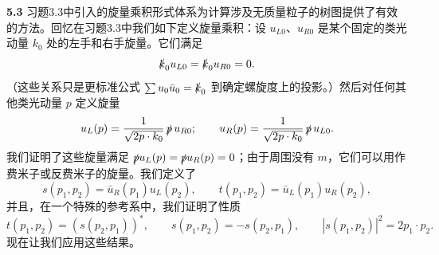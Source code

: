 \textbf{5.3} 习题3.3中引入的旋量乘积形式体系为计算涉及无质量粒子的树图提供了有效的方法。回忆在习题3.3中我们如下定义旋量乘积：设 $u_{L0}$、$u_{R0}$ 是某个固定的类光动量 $k_0$ 处的左手和右手旋量。它们满足
\begin{equation}
  \slashed{k}_0 u_{L0} = \slashed{k}_0 u_{R0} = 0 .
  \label{eq:5.p1}
\end{equation}
（这些关系只是更标准公式 $\sum u_0\bar{u}_0 = \slashed{k}_0$ 到确定螺旋度上的投影。）然后对任何其他类光动量 $p$ 定义旋量
\begin{equation}
  u_L(p) = \frac{1}{\sqrt{2p\cdot k_0}}\,\slashed{p}\,u_{R0};\qquad
  u_R(p) = \frac{1}{\sqrt{2p\cdot k_0}}\,\slashed{p}\,u_{L0} .
  \label{eq:5.p2}
\end{equation}
我们证明了这些旋量满足 $\slashed{p}u_L(p) = \slashed{p}u_R(p) = 0$；由于周围没有 $m$，它们可以用作费米子或反费米子的旋量。我们定义了
\begin{equation}
  s(p_1, p_2) = \bar{u}_R(p_1)u_L(p_2),\qquad
  t(p_1, p_2) = \bar{u}_L(p_1)u_R(p_2),
\end{equation}
并且，在一个特殊的参考系中，我们证明了性质
\begin{equation}
  t(p_1,p_2) = (s(p_2,p_1))^{*},\qquad
  s(p_1,p_2) = -s(p_2,p_1),\qquad
  |s(p_1,p_2)|^2 = 2p_1\cdot p_2 .
  \label{eq:5.p3}
\end{equation}
现在让我们应用这些结果。
